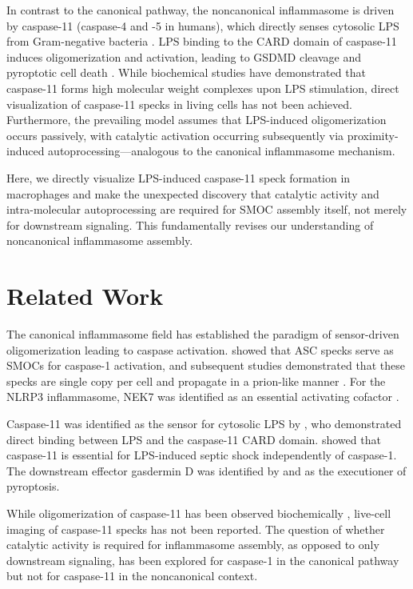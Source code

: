 \documentclass[11pt]{article}
\begin{document}
In contrast to the canonical pathway, the noncanonical inflammasome is driven by caspase-11 (caspase-4 and -5 in humans), which directly senses cytosolic LPS from Gram-negative bacteria \citep{shi2014inflammatory, kayagaki2011non}. LPS binding to the CARD domain of caspase-11 induces oligomerization and activation, leading to GSDMD cleavage and pyroptotic cell death \citep{shi2014inflammatory}. While biochemical studies have demonstrated that caspase-11 forms high molecular weight complexes upon LPS stimulation, direct visualization of caspase-11 specks in living cells has not been achieved. Furthermore, the prevailing model assumes that LPS-induced oligomerization occurs passively, with catalytic activation occurring subsequently via proximity-induced autoprocessing---analogous to the canonical inflammasome mechanism.

Here, we directly visualize LPS-induced caspase-11 speck formation in macrophages and make the unexpected discovery that catalytic activity and intra-molecular autoprocessing are required for SMOC assembly itself, not merely for downstream signaling. This fundamentally revises our understanding of noncanonical inflammasome assembly.

\section{Related Work}

The canonical inflammasome field has established the paradigm of sensor-driven oligomerization leading to caspase activation. \citet{lu2014unified} showed that ASC specks serve as SMOCs for caspase-1 activation, and subsequent studies demonstrated that these specks are single copy per cell and propagate in a prion-like manner \citep{franklin2014adaptor}. For the NLRP3 inflammasome, NEK7 was identified as an essential activating cofactor \citep{he2016nek7}.

Caspase-11 was identified as the sensor for cytosolic LPS by \citet{shi2014inflammatory}, who demonstrated direct binding between LPS and the caspase-11 CARD domain. \citet{kayagaki2011non} showed that caspase-11 is essential for LPS-induced septic shock independently of caspase-1. The downstream effector gasdermin D was identified by \citet{shi2015cleavage} and \citet{kayagaki2015caspase} as the executioner of pyroptosis.

While oligomerization of caspase-11 has been observed biochemically \citep{ross2018dimerization}, live-cell imaging of caspase-11 specks has not been reported. The question of whether catalytic activity is required for inflammasome assembly, as opposed to only downstream signaling, has been explored for caspase-1 in the canonical pathway \citep{broz2010redundant} but not for caspase-11 in the noncanonical context.
\end{document}
